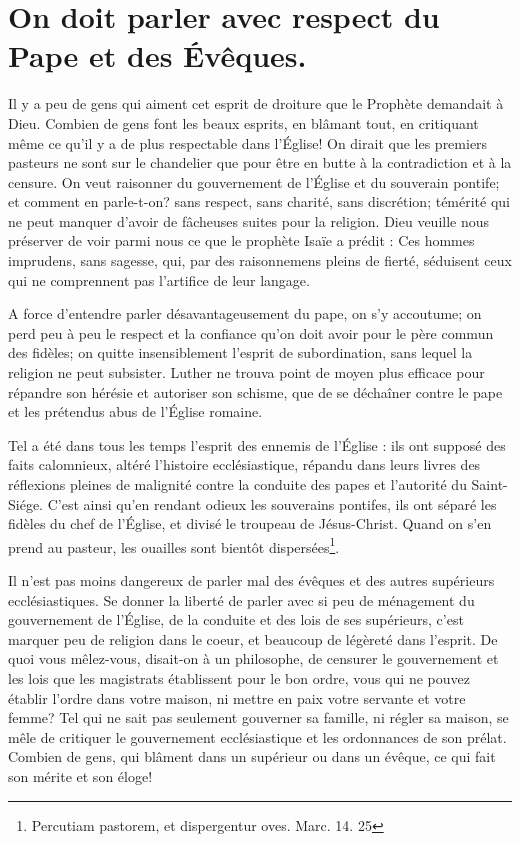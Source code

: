 \documentclass[instructions.tex]{subfiles}
\begin{document}
 
\chapter{On doit parler avec respect du Pape et des Évêques.}
 
\primo Il y a peu de gens qui aiment cet esprit de droiture que le Prophète demandait à Dieu. Combien de gens font les beaux esprits, en blâmant tout, en critiquant même ce qu'il y a de plus respectable dans l'Église! On dirait que les premiers pasteurs ne sont sur le chandelier que pour être en butte à la contradiction et à la censure. On veut raisonner du gouvernement de l'Église et du souverain pontife; et comment en parle-t-on? sans respect, sans charité, sans discrétion; témérité qui ne peut manquer d'avoir de fâcheuses suites pour la religion. Dieu veuille nous préserver de voir parmi nous ce que le prophète Isaïe a prédit : Ces hommes imprudens, sans sagesse, qui, par des raisonnemens pleins de fierté, séduisent ceux qui ne comprennent pas l'artifice de leur langage.
 
A force d'entendre parler désavantageusement du pape, on s'y accoutume; on perd peu à peu le respect et la confiance qu'on doit avoir pour le père commun des fidèles; on quitte insensiblement l'esprit de subordination, sans lequel la religion ne peut subsister. Luther ne trouva point de moyen plus efficace pour répandre son hérésie et autoriser son schisme, que de se déchaîner contre le pape et les prétendus abus de l'Église romaine.
 
Tel a été dans tous les temps l'esprit des ennemis de l'Église : ils ont supposé des faits calomnieux, altéré l'histoire ecclésiastique, répandu dans leurs livres des réflexions pleines de malignité contre la conduite des papes et l'autorité du Saint-Siége. C'est ainsi qu'en rendant odieux les souverains pontifes, ils ont séparé les fidèles du chef de l'Église, et divisé le troupeau de Jésus-Christ. Quand on s'en prend au pasteur, les ouailles sont bientôt dispersées\footnote{Percutiam pastorem, et dispergentur oves. Marc. 14. 25}.
 
\secundo Il n'est pas moins dangereux de parler mal des évêques et des autres supérieurs ecclésiastiques. Se donner la liberté de parler avec si peu de ménagement du gouvernement de l'Église, de la conduite et des lois de ses supérieurs, c'est marquer peu de religion dans le coeur, et beaucoup de légèreté dans l'esprit. De quoi vous mêlez-vous, disait-on à un philosophe, de censurer le gouvernement et les lois que les magistrats établissent pour le bon ordre, vous qui ne pouvez établir l'ordre dans votre maison, ni mettre en paix votre servante et votre femme? Tel qui ne sait pas seulement gouverner sa famille, ni régler sa maison, se mêle de critiquer le gouvernement ecclésiastique et les ordonnances de son prélat. Combien de gens, qui blâment dans un supérieur ou dans un évêque, ce qui fait son mérite et son éloge!
 
\end{document}
